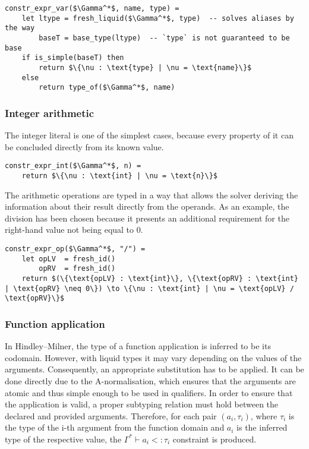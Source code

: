 \begin{minipage}{\linewidth}
\begin{lstlisting}[language=pseudocode]
constr_expr_var($\Gamma^*$, name, type) =
    let ltype = fresh_liquid($\Gamma^*$, type)  -- solves aliases by the way
        baseT = base_type(ltype)  -- `type` is not guaranteed to be base
    if is_simple(baseT) then
        return $\{\nu : \text{type} | \nu = \text{name}\}$
    else
        return type_of($\Gamma^*$, name)
\end{lstlisting}
\end{minipage}

\subsubsection{Integer arithmetic}
\label{constr_expr_int}

The integer literal is one of the simplest cases, because every property of it
can be concluded directly from its known value.

\begin{lstlisting}[language=pseudocode]
constr_expr_int($\Gamma^*$, n) =
    return $\{\nu : \text{int} | \nu = \text{n}\}$
\end{lstlisting}

The arithmetic operations are typed in a way that allows the solver deriving the
information about their result directly from the operands. As an example, the
division has been chosen because it presents an additional requirement for the
right-hand value not being equal to 0.

\begin{lstlisting}[language=pseudocode]
constr_expr_op($\Gamma^*$, "/") =
    let opLV  = fresh_id()
        opRV  = fresh_id()
    return $(\{\text{opLV} : \text{int}\}, \{\text{opRV} : \text{int} | \text{opRV} \neq 0\}) \to \{\nu : \text{int} | \nu = \text{opLV} / \text{opRV}\}$
\end{lstlisting}

\subsubsection{Function application}

In Hindley--Milner, the type of a function application is inferred to be its
codomain. However, with liquid types it may vary depending on the values of the
arguments. Consequently, an appropriate substitution has to be applied. It can
be done directly due to the A-normalisation, which ensures that the arguments
are atomic and thus simple enough to be used in qualifiers. In order to ensure
that the application is valid, a proper subtyping relation must hold between the
declared and provided arguments. Therefore, for each pair $(a_i, \tau_i)$, where
$\tau_i$ is the type of the i-th argument from the function domain and $a_i$ is
the inferred type of the respective value, the $\Gamma^* \vdash a_i <: \tau_i$
constraint is produced.

